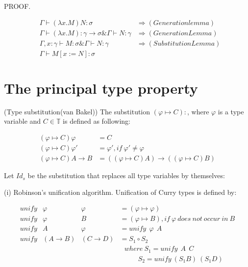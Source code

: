 \noindent PROOF.

\begin{align*}
   &\Gamma \vdash (\lambda x.M)N:\sigma & \Rightarrow (Generation lemma)\\
   &\Gamma \vdash (\lambda x.M):\gamma \rightarrow \sigma \& \Gamma \vdash N:\gamma &  \Rightarrow (Generation Lemma)\\
   &\Gamma ,x:\gamma \vdash M:\sigma \& \Gamma \vdash N:\gamma & \Rightarrow (Substitution Lemma)\\
   &\Gamma \vdash M[x:=N]:\sigma
\end{align*} 



\section{The principal type property}

\begin{def1}{\label{def:tsub}}
\normalfont (Type substitution(van Bakel\cite{svb2001type})) The substitution $(\varphi \mapsto C): $, where $\varphi$ is a type variable and $C \in \mathbb{T}$ is defined as following:
\end{def1}

\begin{equation*}
\begin{array}{ll}
(\varphi \mapsto C)\varphi        & = C\\
(\varphi \mapsto C)\varphi '      & = \varphi ',if\ \varphi '\neq \varphi\\
(\varphi \mapsto C)A\rightarrow B & = ((\varphi \mapsto C)A)\rightarrow ((\varphi \mapsto C)B)
\end{array}
\end{equation*}


\begin{def1}\label{eq:rob}
\normalfont Let $Id_s$ be the substitution that replaces all type variables by themselves:
\end{def1}

\noindent (i) Robinson's unification algorithm. Unification of Curry types is defined by:

\begin{equation*}
\begin{array}{llll}
unify & \varphi            & \varphi          & = (\varphi \mapsto \varphi)\\
unify & \varphi            & B                & = (\varphi \mapsto B), if\ \varphi \ does\ not\ occur\ in\ B\\
unify & A                  & \varphi          & = unify\ \ \varphi\ \ A\\
unify & (A\rightarrow B)   & (C\rightarrow D) & = S_1\circ S_2\\
&&&\ \ \ where\ S_1 = unify\ \ A\ \ C\\
&&&\ \ \ \ \ \ \ \ \ \ \ \ S_2 = unify\ (S_1B)\ (S_1D)
\end{array}
\end{equation*}


